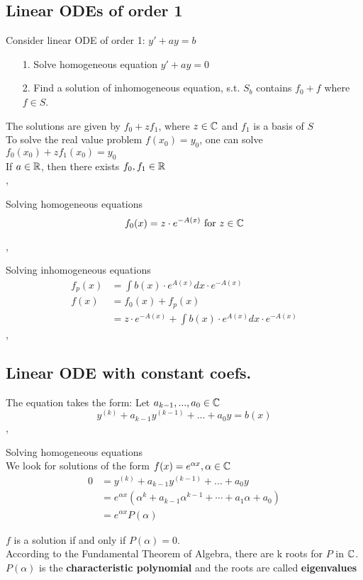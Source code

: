 \subsection{Linear ODEs of order 1}
\Def Consider linear ODE of order 1: $y' + ay = b $
\begin{enumerate}
\item[1.] Solve homogeneous equation $y' + ay = 0$ 
\item[2.] Find a solution of inhomogeneous equation, s.t. $S_b$ contains $f_0 + f$ where $f \in S$.
\end{enumerate}
\Bem The solutions are given by $f_0 + z f_1$, where $z \in \mathbb{C}$ and $f_1$ is a basis of $S$ \\
\Bem To solve the real value problem $f(x_0) = y_0$, one can solve $f_0(x_0) + z f_1(x_0) = y_0$ \\
\Bem If $a \in \mathbb{R}$, then there exists $f_0, f_1 \in \mathbb{R}$ \\

\sep

\Procedure Solving homogeneous equations
\[ f_0(x) = z \cdot e^{-A(x)} \text{ for } z \in \mathbb{C}\]

\sep

\Procedure Solving inhomogeneous equations
\begin{align*}
f_p(x) &= \int b(x) \cdot e^{A(x)} dx \cdot e^{-A(x)} \\
f(x) &= f_0(x) + f_p(x) \\
&= z \cdot e^{-A(x)} + \int b(x) \cdot e^{A(x)} dx \cdot e^{-A(x)}
\end{align*}
\sep

\subsection{Linear ODE with constant coefs. }
The equation takes the form: Let $a_{k - 1}, ..., a_0 \in \mathbb{C}$
\[ y^{(k)} + a_{k - 1} y^{(k - 1)} + ... + a_0 y = b(x) \] 
\sep

\Procedure Solving homogeneous equations \\
We look for solutions of the form $f(x) = e^{\alpha x}, \alpha \in \mathbb{C}$
\begin{align*}
0 &=y^{(k)} + a_{k - 1} y^{(k - 1)} + ... + a_0 y \\
&=  e^{\alpha x}( \alpha^k + a_{k - 1} \alpha^{k - 1} + \cdots + a_1 \alpha + a_0) \\
&= e^{\alpha x} P(\alpha)
\end{align*}

\Theorem $f$ is a solution if and only if $P(\alpha) = 0$. \\
\Bem According to the Fundamental Theorem of Algebra, there are k roots for $P$ in $\mathbb{C}$. \\
\Bem $P(\alpha)$ is the \textbf{characteristic polynomial} and the roots are called \textbf{eigenvalues}\\

